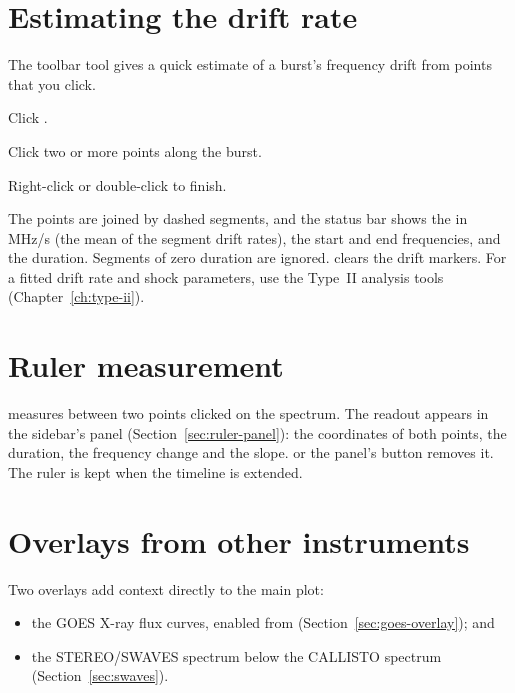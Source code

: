 \section{Estimating the drift rate}
\label{sec:drift}

The  toolbar tool gives a quick estimate of a burst's frequency
drift from points that you click.
\begin{steps}
  \item Click .
  \item Click two or more points along the burst.
  \item Right-click or double-click to finish.
\end{steps}
The points are joined by dashed segments, and the status bar shows the
 in MHz/s (the mean of the segment drift rates), the start and end
frequencies, and the duration. Segments of zero duration are ignored. 
clears the drift markers. For a fitted drift rate and shock parameters, use the Type~II
analysis tools (Chapter~\ref{ch:type-ii}).

\section{Ruler measurement}
\label{sec:ruler}

 measures between two points clicked on the spectrum.
The readout appears in the sidebar's  panel
(Section~\ref{sec:ruler-panel}): the coordinates of both points, the duration, the
frequency change and the slope.  or the panel's
 button removes it. The ruler is kept when the timeline is extended.

\section{Overlays from other instruments}

Two overlays add context directly to the main plot:
\begin{itemize}
  \item the GOES X-ray flux curves, enabled from 
    (Section~\ref{sec:goes-overlay}); and
  \item the STEREO/SWAVES spectrum below the CALLISTO spectrum
    (Section~\ref{sec:swaves}).
\end{itemize}
